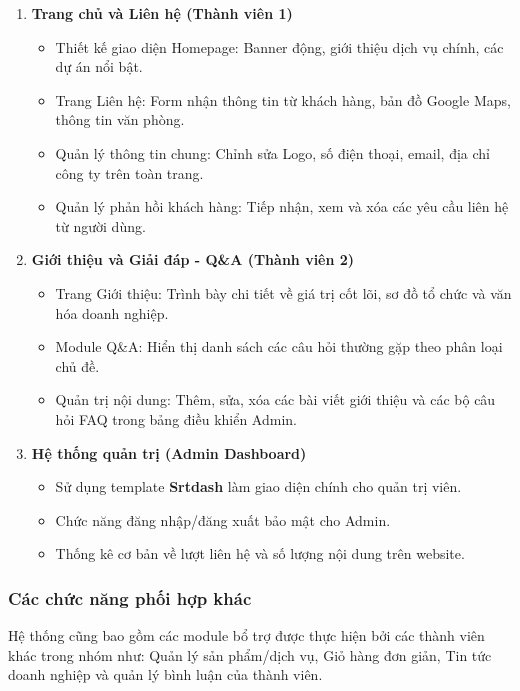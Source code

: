 \begin{enumerate}
    \item \textbf{Trang chủ và Liên hệ (Thành viên 1)}
    \begin{itemize}
        \item Thiết kế giao diện Homepage: Banner động, giới thiệu dịch vụ chính, các dự án nổi bật.
        \item Trang Liên hệ: Form nhận thông tin từ khách hàng, bản đồ Google Maps, thông tin văn phòng.
        \item Quản lý thông tin chung: Chỉnh sửa Logo, số điện thoại, email, địa chỉ công ty trên toàn trang.
        \item Quản lý phản hồi khách hàng: Tiếp nhận, xem và xóa các yêu cầu liên hệ từ người dùng.
    \end{itemize}

    \item \textbf{Giới thiệu và Giải đáp - Q\&A (Thành viên 2)}
    \begin{itemize}
        \item Trang Giới thiệu: Trình bày chi tiết về giá trị cốt lõi, sơ đồ tổ chức và văn hóa doanh nghiệp.
        \item Module Q\&A: Hiển thị danh sách các câu hỏi thường gặp theo phân loại chủ đề.
        \item Quản trị nội dung: Thêm, sửa, xóa các bài viết giới thiệu và các bộ câu hỏi FAQ trong bảng điều khiển Admin.
    \end{itemize}

    \item \textbf{Hệ thống quản trị (Admin Dashboard)}
    \begin{itemize}
        \item Sử dụng template \textbf{Srtdash} làm giao diện chính cho quản trị viên.
        \item Chức năng đăng nhập/đăng xuất bảo mật cho Admin.
        \item Thống kê cơ bản về lượt liên hệ và số lượng nội dung trên website.
    \end{itemize}
\end{enumerate}

\subsubsection{Các chức năng phối hợp khác}
Hệ thống cũng bao gồm các module bổ trợ được thực hiện bởi các thành viên khác trong nhóm như: Quản lý sản phẩm/dịch vụ, Giỏ hàng đơn giản, Tin tức doanh nghiệp và quản lý bình luận của thành viên.
